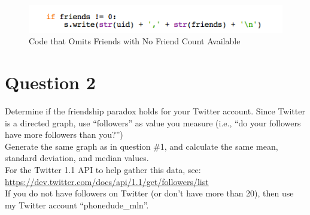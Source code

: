 \documentclass{article}
\begin{document}
\begin{figure}[H]
\centering
\includegraphics[scale=0.75]{q1/nofriendcount}
\caption{Code that Omits Friends with No Friend Count Available}
\label{nofriendcount}
\end{figure}





\newpage

\section*{Question 2}

Determine if the friendship paradox holds for your Twitter account. Since Twitter is a directed graph, use ``followers'' as value you measure (i.e., ``do your followers have more followers than you?'') \\

Generate the same graph as in question \#1, and calculate the same mean, standard deviation, and median values. \\

For the Twitter 1.1 API to help gather this data, see: \\

\url{https://dev.twitter.com/docs/api/1.1/get/followers/list} \\

If you do not have followers on Twitter (or don't have more than 20), then use my Twitter account ``phonedude\_mln''.

\end{document}
